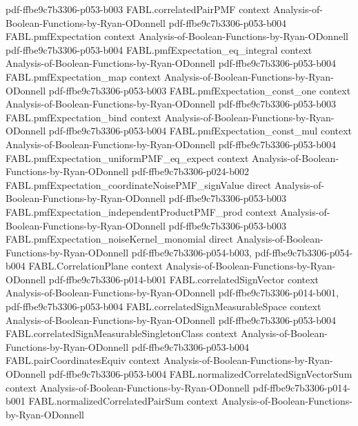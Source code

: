 \begin{theorem}
  {pdf-ffbe9c7b3306-p053-b003}
\proofstep
  {FABL.correlatedPairPMF}
  {context}
  {Analysis-of-Boolean-Functions-by-Ryan-ODonnell}
  {pdf-ffbe9c7b3306-p053-b004}
\proofstep
  {FABL.pmfExpectation}
  {context}
  {Analysis-of-Boolean-Functions-by-Ryan-ODonnell}
  {pdf-ffbe9c7b3306-p053-b004}
\proofstep
  {FABL.pmfExpectation_eq_integral}
  {context}
  {Analysis-of-Boolean-Functions-by-Ryan-ODonnell}
  {pdf-ffbe9c7b3306-p053-b004}
\proofstep
  {FABL.pmfExpectation_map}
  {context}
  {Analysis-of-Boolean-Functions-by-Ryan-ODonnell}
  {pdf-ffbe9c7b3306-p053-b003}
\proofstep
  {FABL.pmfExpectation_const_one}
  {context}
  {Analysis-of-Boolean-Functions-by-Ryan-ODonnell}
  {pdf-ffbe9c7b3306-p053-b003}
\proofstep
  {FABL.pmfExpectation_bind}
  {context}
  {Analysis-of-Boolean-Functions-by-Ryan-ODonnell}
  {pdf-ffbe9c7b3306-p053-b004}
\proofstep
  {FABL.pmfExpectation_const_mul}
  {context}
  {Analysis-of-Boolean-Functions-by-Ryan-ODonnell}
  {pdf-ffbe9c7b3306-p053-b004}
\proofstep
  {FABL.pmfExpectation_uniformPMF_eq_expect}
  {context}
  {Analysis-of-Boolean-Functions-by-Ryan-ODonnell}
  {pdf-ffbe9c7b3306-p024-b002}
\proofstep
  {FABL.pmfExpectation_coordinateNoisePMF_signValue}
  {direct}
  {Analysis-of-Boolean-Functions-by-Ryan-ODonnell}
  {pdf-ffbe9c7b3306-p053-b003}
\proofstep
  {FABL.pmfExpectation_independentProductPMF_prod}
  {context}
  {Analysis-of-Boolean-Functions-by-Ryan-ODonnell}
  {pdf-ffbe9c7b3306-p053-b003}
\proofstep
  {FABL.pmfExpectation_noiseKernel_monomial}
  {direct}
  {Analysis-of-Boolean-Functions-by-Ryan-ODonnell}
  {pdf-ffbe9c7b3306-p054-b003,
    pdf-ffbe9c7b3306-p054-b004}
\proofstep
  {FABL.CorrelationPlane}
  {context}
  {Analysis-of-Boolean-Functions-by-Ryan-ODonnell}
  {pdf-ffbe9c7b3306-p014-b001}
\proofstep
  {FABL.correlatedSignVector}
  {context}
  {Analysis-of-Boolean-Functions-by-Ryan-ODonnell}
  {pdf-ffbe9c7b3306-p014-b001,
    pdf-ffbe9c7b3306-p053-b004}
\proofstep
  {FABL.correlatedSignMeasurableSpace}
  {context}
  {Analysis-of-Boolean-Functions-by-Ryan-ODonnell}
  {pdf-ffbe9c7b3306-p053-b004}
\proofstep
  {FABL.correlatedSignMeasurableSingletonClass}
  {context}
  {Analysis-of-Boolean-Functions-by-Ryan-ODonnell}
  {pdf-ffbe9c7b3306-p053-b004}
\proofstep
  {FABL.pairCoordinatesEquiv}
  {context}
  {Analysis-of-Boolean-Functions-by-Ryan-ODonnell}
  {pdf-ffbe9c7b3306-p053-b004}
\proofstep
  {FABL.normalizedCorrelatedSignVectorSum}
  {context}
  {Analysis-of-Boolean-Functions-by-Ryan-ODonnell}
  {pdf-ffbe9c7b3306-p014-b001}
\proofstep
  {FABL.normalizedCorrelatedPairSum}
  {context}
  {Analysis-of-Boolean-Functions-by-Ryan-ODonnell}

\end{theorem}
